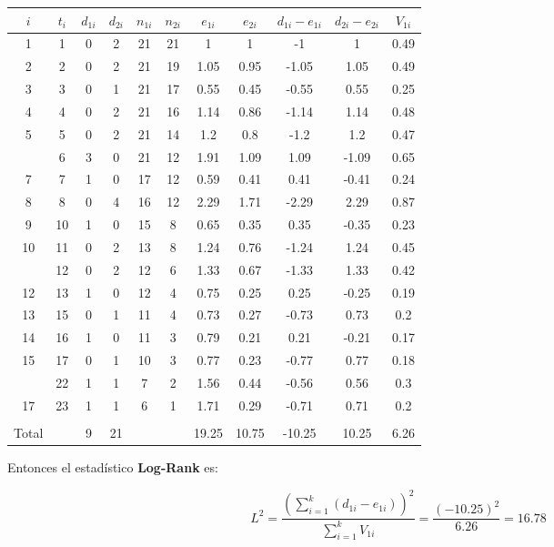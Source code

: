 \documentclass[
  a4paper,
  oneside,
  openany]{book}
\begin{document}
\begin{table}
\centering
\begin{tabular}{ccccccccccc}
\toprule
$i$ & $t_i$ & $d_{1i}$ & $d_{2i}$ & $n_{1i}$ & $n_{2i}$ & $e_{1i}$ & $e_{2i}$ & $d_{1i} - e_{1i}$ & $d_{2i} - e_{2i}$ & $V_{1i}$\\
\midrule
1 & 1 & 0 & 2 & 21 & 21 & 1 & 1 & -1 & 1 & 0.49\\
2 & 2 & 0 & 2 & 21 & 19 & 1.05 & 0.95 & -1.05 & 1.05 & 0.49\\
3 & 3 & 0 & 1 & 21 & 17 & 0.55 & 0.45 & -0.55 & 0.55 & 0.25\\
4 & 4 & 0 & 2 & 21 & 16 & 1.14 & 0.86 & -1.14 & 1.14 & 0.48\\
5 & 5 & 0 & 2 & 21 & 14 & 1.2 & 0.8 & -1.2 & 1.2 & 0.47\\
\addlinespace
6 & 6 & 3 & 0 & 21 & 12 & 1.91 & 1.09 & 1.09 & -1.09 & 0.65\\
7 & 7 & 1 & 0 & 17 & 12 & 0.59 & 0.41 & 0.41 & -0.41 & 0.24\\
8 & 8 & 0 & 4 & 16 & 12 & 2.29 & 1.71 & -2.29 & 2.29 & 0.87\\
9 & 10 & 1 & 0 & 15 & 8 & 0.65 & 0.35 & 0.35 & -0.35 & 0.23\\
10 & 11 & 0 & 2 & 13 & 8 & 1.24 & 0.76 & -1.24 & 1.24 & 0.45\\
\addlinespace
11 & 12 & 0 & 2 & 12 & 6 & 1.33 & 0.67 & -1.33 & 1.33 & 0.42\\
12 & 13 & 1 & 0 & 12 & 4 & 0.75 & 0.25 & 0.25 & -0.25 & 0.19\\
13 & 15 & 0 & 1 & 11 & 4 & 0.73 & 0.27 & -0.73 & 0.73 & 0.2\\
14 & 16 & 1 & 0 & 11 & 3 & 0.79 & 0.21 & 0.21 & -0.21 & 0.17\\
15 & 17 & 0 & 1 & 10 & 3 & 0.77 & 0.23 & -0.77 & 0.77 & 0.18\\
\addlinespace
16 & 22 & 1 & 1 & 7 & 2 & 1.56 & 0.44 & -0.56 & 0.56 & 0.3\\
17 & 23 & 1 & 1 & 6 & 1 & 1.71 & 0.29 & -0.71 & 0.71 & 0.2\\
 &  &  &  &  &  &  &  &  &  & \\
Total &  & 9 & 21 &  &  & 19.25 & 10.75 & -10.25 & 10.25 & 6.26\\
\bottomrule
\end{tabular}
\end{table}

Entonces el estadístico \textbf{Log-Rank} es:

\[
L^2=\frac{(\sum_{i = 1}^k(d_{1i}-e_{1i}))^2}{\sum_{i=1}^{k}V_{1i}}=\frac{(-10.25)^2}{6.26}=16.78
\]
\end{document}
